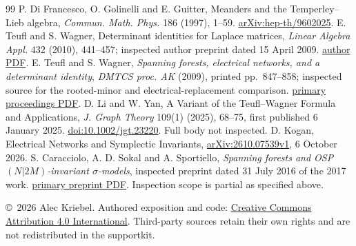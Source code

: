 \documentclass[11pt]{article}
\begin{document}
\begin{thebibliography}{99}
 P. Di Francesco, O. Golinelli and E. Guitter, Meanders and the Temperley--Lieb algebra, \emph{Commun. Math. Phys.} 186 (1997), 1--59. \href{https://arxiv.org/abs/hep-th/9602025}{arXiv:hep-th/9602025}.
 E. Teufl and S. Wagner, Determinant identities for Laplace matrices, \emph{Linear Algebra Appl.} 432 (2010), 441--457; inspected author preprint dated 15 April 2009. \href{https://math.sun.ac.za/swagner/determinant.pdf}{author PDF}.
 E. Teufl and S. Wagner, \emph{Spanning forests, electrical networks, and a determinant identity}, \emph{DMTCS proc. AK} (2009), printed pp.~847--858; inspected source for the rooted-minor and electrical-replacement comparison. \href{https://dmtcs.episciences.org/2699/pdf}{primary proceedings PDF}.
 D. Li and W. Yan, A Variant of the Teufl--Wagner Formula and Applications, \emph{J. Graph Theory} 109(1) (2025), 68--75, first published 6 January 2025. \href{https://doi.org/10.1002/jgt.23220}{doi:10.1002/jgt.23220}. Full body not inspected.
 D. Kogan, Electrical Networks and Symplectic Invariants, \href{https://arxiv.org/pdf/2610.07539v1}{arXiv:2610.07539v1}, 6 October 2026.
 S. Caracciolo, A. D. Sokal and A. Sportiello, \emph{Spanning forests and OSP$(N|2M)$-invariant $\sigma$-models}, inspected preprint dated 31 July 2016 of the 2017 work. \href{https://discovery.ucl.ac.uk/10025167/1/forests_ON_v3gA.pdf}{primary preprint PDF}. Inspection scope is partial as specified above.
\end{thebibliography}
\vfill\noindent\small\copyright\ 2026 Alec Kriebel. Authored exposition and code: \href{https://creativecommons.org/licenses/by/4.0/}{Creative Commons Attribution 4.0 International}. Third-party sources retain their own rights and are not redistributed in the supportkit.
\end{document}
